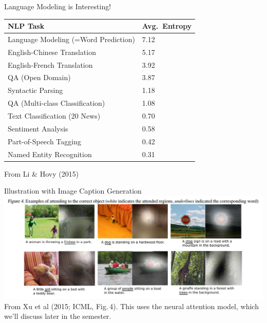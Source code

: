 \documentclass[xcolor=pdftex,x11names,table,hyperref]{beamer}
\newcommand{\tablecolors}{\rowcolors{2}{blue!12}{white}} %
\begin{document}
\begin{frame}{Language Modeling is Interesting!}
 \begin{block}{}

\begin{center}
\begin{small}
\begin{spacing}{1.4}
\tablecolors
\begin{tabular}{l|l}
	\hline
	\bf NLP Task & \bf Avg.\ Entropy \\
	\hline
	\hline
	Language Modeling (=Word Prediction) & 7.12 \\
	English-Chinese Translation & 5.17 \\
	English-French Translation & 3.92 \\
	QA (Open Domain) & 3.87 \\
	Syntactic Parsing & 1.18 \\
	QA (Multi-class Classification) & 1.08 \\
	Text Classification (20 News) & 0.70 \\
	Sentiment Analysis & 0.58 \\
	Part-of-Speech Tagging & 0.42 \\
	Named Entity Recognition & 0.31 \\
	\hline
\end{tabular}
\end{spacing}
\end{small}
\end{center}
\vspace*{-2.3em}
\end{block}
\vspace*{-0.5em}
\tiny{From Li \& Hovy (2015)\nocite{li-hovy2015}}
\end{frame}

\begin{frame}{Illustration with Image Caption Generation}
	\includegraphics[width=1.03\textwidth]{images/xu-etal2015_icml_fig4.jpg} \\[1.5em]
	\tiny{From Xu et al (2015; ICML, Fig.\,4)\nocite{xu-etal2015}}.  This uses the neural attention model, which we'll discuss later in the semester.
\end{frame}





\end{document}
